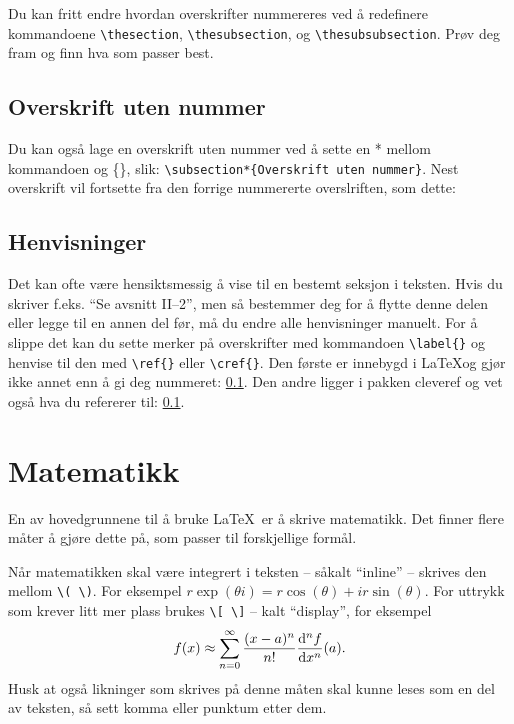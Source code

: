 Du kan fritt endre hvordan overskrifter nummereres ved å redefinere kommandoene
\lstinline$\thesection$, \lstinline$\thesubsection$, og \lstinline$\thesubsubsection$.
Prøv deg fram og finn hva som passer best.

\subsection*{Overskrift uten nummer}
Du kan også lage en overskrift uten nummer ved å sette en * mellom kommandoen og \{\}, slik:
\lstinline$\subsection*{Overskrift uten nummer}$.
Nest overskrift vil fortsette fra den forrige nummererte overslriften, som dette:

\subsection{Henvisninger}\label{ov:henvisninger}
Det kan ofte være hensiktsmessig å vise til en bestemt seksjon i teksten. Hvis du skriver
f.eks. ``Se avsnitt II--2'', men så bestemmer deg for å flytte denne delen eller legge til
en annen del før, må du endre alle henvisninger manuelt.
For å slippe det kan du sette merker på overskrifter med kommandoen \lstinline$\label{}$
 og henvise til den med \lstinline$\ref{}$ eller \lstinline$\cref{}$. Den første er
innebygd i \LaTeX og gjør ikke annet enn å gi deg nummeret: \ref{ov:henvisninger}.
Den andre ligger i pakken cleveref og vet også hva du refererer til: \cref{ov:henvisninger}.


\section{Matematikk}

En av hovedgrunnene til å bruke \LaTeX~er å skrive matematikk. Det finner flere måter å
gjøre dette på, som passer til forskjellige formål.

Når matematikken skal være integrert i teksten -- såkalt ``inline'' -- skrives den mellom
\lstinline{\( \)}. For eksempel \(r\exp(\theta i) = r\cos(\theta) + ir\sin(\theta)\). For
uttrykk som krever litt mer plass brukes \lstinline{\[ \]} -- kalt ``display'', for eksempel
\[
	f(x) \approx \sum_{n=0}^{\infty} \frac{(x-a)^n}{n!}\dv[n]{f}{x}\qty(a) .
\]
Husk at også likninger som skrives på denne måten skal kunne leses som en del av teksten, så
sett komma eller punktum etter dem.


